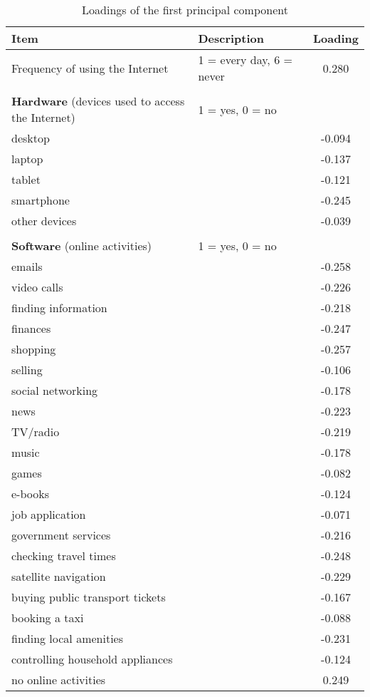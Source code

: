 \documentclass[12pt]{article}
\begin{document}
    \begin{table}[h!]
        \centering
        \caption{Loadings of the first principal component}
        \label{tab:pc1_loadings_q1}
        \begin{tabular}{llc}
            \toprule
            Item & Description & Loading \\
            \midrule
            Frequency of using the Internet & 1 = every day, 6 = never & 0.280 \\
            & & \\
            \textbf{Hardware} (devices used to access the Internet) & 1 = yes, 0 = no & \\
            desktop &  & -0.094 \\
            laptop &  & -0.137 \\
            tablet &  & -0.121 \\
            smartphone &  & -0.245 \\
            other devices &  & -0.039 \\
            & & \\
            \textbf{Software} (online activities) & 1 = yes, 0 = no & \\
            emails &  & -0.258 \\
            video calls &  & -0.226 \\
            finding information &  & -0.218 \\
            finances &  & -0.247 \\
            shopping &  & -0.257 \\
            selling &  & -0.106 \\
            social networking &  & -0.178 \\
            news &  & -0.223 \\
            TV/radio &  & -0.219 \\
            music &  & -0.178 \\
            games &  & -0.082 \\
            e-books &  & -0.124 \\
            job application &  & -0.071 \\
            government services &  & -0.216 \\
            checking travel times &  & -0.248 \\
            satellite navigation &  & -0.229 \\
            buying public transport tickets &  & -0.167 \\
            booking a taxi &  & -0.088 \\
            finding local amenities &  & -0.231 \\
            controlling household appliances &  & -0.124 \\
            no online activities &  & 0.249 \\
            \bottomrule
        \end{tabular}
    \end{table}
\end{document}
